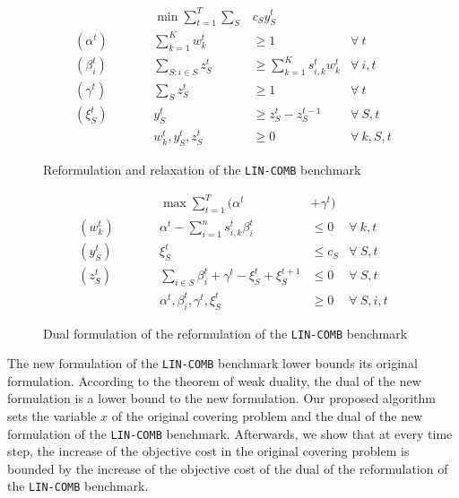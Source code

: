 \begin{figure}[ht]
    \begin{mdframed}
        \begin{align*}
            && \min \sum_{t = 1}^{T} \sum_{S} & c_S y_S^t \\
            (\alpha^{t}) \qquad && \sum_{k=1}^{K} w_{k}^{t} & \geq 1  & \forall\ t \\
            (\beta_{i}^{t}) \qquad && \sum_{S: i \in S} z_{S}^{t} &\geq \sum_{k=1}^{K} s_{i,k}^{t} w_{k}^{t}   &\forall\ i,t\\
            (\gamma^{t}) \qquad && \sum_{S} z_{S}^{t} &\ge 1   &\forall\ t\\
            (\xi_{S}^{t}) \qquad && y_{S}^{t} &\geq z_{S}^{t} - z_{S}^{t-1}   &\forall\ S,t\\
            && w_{k}^{t}, y_{S}^{t}, z_{S}^{t} & \ge 0 & \forall\ k,S,t
        \end{align*}
    \end{mdframed}
    \caption{Reformulation and relaxation of the \texttt{LIN-COMB} benchmark}
    \label{fig:reformulation}
\end{figure}

\begin{figure}[ht]
    \begin{mdframed}
        \begin{align*}
            && \max \sum_{t=1}^{T}  (\alpha^{t} &+ \gamma^{t}) \\
            (w_{k}^{t}) \qquad && \alpha^{t} - \sum_{i=1}^{n} s_{i,k}^{t} \beta_{i}^{t}  &\leq 0  &\forall\ k,t\\
            (y_{S}^{t}) \qquad && \xi_{S}^{t}   &\leq c_{S}  &\forall\ S,t \\
            (z_{S}^{t}) \qquad && \sum_{i \in S}\beta_{i}^{t} + \gamma^{t} - \xi_{S}^{t} + \xi_{S}^{t+1}  &\leq 0  &\forall\ S,t \\
            && \alpha^{t}, \beta_{i}^{t}, \gamma^{t}, \xi_{S}^{t} & \ge 0 & \forall\ S,i,t
        \end{align*}
    \end{mdframed}
    \caption{Dual formulation of the reformulation of the \texttt{LIN-COMB} benchmark}
    \label{fig:ref-dual}
\end{figure}

The new formulation of the \texttt{LIN-COMB} benchmark lower bounds its original formulation. According to the theorem of weak duality, the dual of the new formulation is a lower bound to the new formulation. Our proposed algorithm sets the variable $x$ of the original covering problem and the dual of the new formulation of the \texttt{LIN-COMB} benchmark. Afterwards, we show that at every time step, the increase of the objective cost in the original covering problem is bounded by the increase of the objective cost of the dual of the reformulation of the \texttt{LIN-COMB} benchmark.

